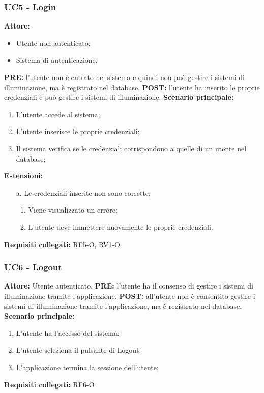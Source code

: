 \documentclass[a4paper, 12pt]{article}
\begin{document}
\subsubsection{UC5 - Login}
\textbf{Attore:} 
\begin{itemize}
    \item Utente non autenticato;
    \item Sistema di autenticazione.
\end{itemize}
\textbf{PRE:} l'utente non è entrato nel sistema e quindi non può gestire i sistemi di illuminazione, ma è registrato nel database.\newline
\textbf{POST:} l'utente ha inserito le proprie credenziali e può gestire i sistemi di illuminazione.\newline
\textbf{Scenario principale:}
\begin{enumerate}
    \item L'utente accede al sistema;
    \item L'utente inserisce le proprie credenziali;
    \item Il sistema verifica se le credenziali corrispondono a quelle di un utente nel database;
\end{enumerate}
\textbf{Estensioni:}
\begin{itemize}
    \item [a.] Le credenziali inserite non sono corrette;
    \begin{enumerate}
        \item Viene visualizzato un errore;
        \item L'utente deve immettere nuovamente le proprie credenziali.
    \end{enumerate}
\end{itemize}
\textbf{Requisiti collegati:} RF5-O, RV1-O\newline

\subsubsection{UC6 - Logout}
\textbf{Attore:} Utente autenticato.\newline
\textbf{PRE:} l'utente ha il consenso di gestire i sistemi di illuminazione tramite l'applicazione.\newline
\textbf{POST:} all'utente non è consentito gestire i sistemi di illuminazione tramite l'applicazione, ma è registrato nel database.\newline
\textbf{Scenario principale:}
\begin{enumerate}
    \item L'utente ha l'accesso del sistema;
    \item L'utente seleziona il pulsante di Logout;
    \item L'applicazione termina la sessione dell'utente;
\end{enumerate}
\textbf{Requisiti collegati:} RF6-O\newline
\end{document}
